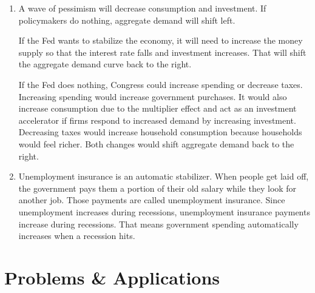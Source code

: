 \documentclass{article}
\begin{document}
\begin{enumerate}
When government spending boosts household income and consumption, households need to hold more money for their additional purchases. That increases the demand for money which increases the interest rate (if the Fed doesn't increase the money supply in response). A higher interest rate decreases investment, so government spending could crowd out private investment and partially offset the increase in aggregate demand. As a result, aggregate demand could increase by less than \$3 billion. 

\item A wave of pessimism will decrease consumption and investment. If policymakers do nothing, aggregate demand will shift left.

If the Fed wants to stabilize the economy, it will need to increase the money supply so that the interest rate falls and investment increases. That will shift the aggregate demand curve back to the right.

If the Fed does nothing, Congress could increase spending or decrease taxes. Increasing spending would increase government purchases. It would also increase consumption due to the multiplier effect and act as an investment accelerator if firms respond to increased demand by increasing investment. Decreasing taxes would increase household consumption because households would feel richer. Both changes would shift aggregate demand back to the right.  

\item Unemployment insurance is an automatic stabilizer. When people get laid off, the government pays them a portion of their old salary while they look for another job. Those payments are called unemployment insurance. Since unemployment increases during recessions, unemployment insurance payments increase during recessions. That means government spending automatically increases when a recession hits.

\end{enumerate}

\section*{Problems \& Applications}
\end{document}
